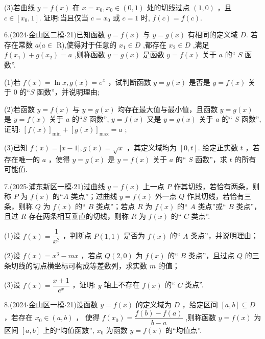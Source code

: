 (3)若曲线 $y = f\left( x\right)$ 在 $x = {x}_{0},{x}_{0} \in  \left( {0,1}\right)$ 处的切线过点 $\left( {1,0}\right)$ ，且 $c \in  \left\lbrack  {{x}_{0},1}\right\rbrack$. 证明:当且仅当 $c =  {x}_{0}$ 或 $c = 1$ 时, $\overline{f}\left( c\right)  = f\left( c\right)$.

6.(2024$\cdot$金山区二模$\cdot$21)已知函数 $y = f\left( x\right)$ 与 $y = g\left( x\right)$ 有相同的定义域 $D$. 若存在常数 $a(a \in$ R),使得对于任意的 ${x}_{1} \in  D$ ,都存在 ${x}_{2} \in  D$ ,满足 $f\left( {x}_{1}\right)  + g\left( {x}_{2}\right)  = a$ ,则称函数 $y = g\left( x\right)$ 是函数 $y = f\left( x\right)$ 关于 $a$ 的“ $S$ 函数”.

(1)若 $f\left( x\right)  = \ln x,g\left( x\right)  = {{e}}^{x}$ ，试判断函数 $y = g\left( x\right)$ 是否是 $y = f\left( x\right)$ 关于 0 的“$S$ 函数”，并说明理由;

(2)若函数 $y = f\left( x\right)$ 与 $y = g\left( x\right)$ 均存在最大值与最小值，且函数 $y = g\left( x\right)$ 是 $y = f\left( x\right)$ 关于 $a$ 的“$S$ 函数”, $y = f\left( x\right)$ 又是 $y = g\left( x\right)$ 关于 $a$ 的“ $S$ 函数”,证明: ${\left\lbrack  f\left( x\right) \right\rbrack  }_{\min } + {\left\lbrack  g\left( x\right) \right\rbrack  }_{\max } = a$ ;

(3)已知 $f\left( x\right)  = \left| {x - 1}\right| ,g\left( x\right)  = \sqrt{x}$ ，其定义域均为 $\left\lbrack  {0,t}\right\rbrack$. 给定正实数 $t$ ，若存在唯一的 $a$ ，使得 $y = g\left( x\right)$ 是 $y = f\left( x\right)$ 关于 $a$ 的“ $S$ 函数”，求 $t$ 的所有可能值.

7.(2025$\cdot$浦东新区一模$\cdot$21)过曲线 $y = f\left( x\right)$ 上一点 $P$ 作其切线，若恰有两条，则称 $P$ 为 $f\left( x\right)$ 的“$A$ 类点”；过曲线 $y = f\left( x\right)$ 外一点 $Q$ 作其切线，若恰有三条，则称 $Q$ 为 $f\left( x\right)$ 的“ $B$ 类点”；若点 $R$ 为 $f\left( x\right)$ 的“ $A$ 类点”或“ $B$ 类点”，且过 $R$ 存在两条相互垂直的切线，则称 $R$ 为 $f\left( x\right)$ 的“ $C$ 类点”.

(1)设 $f\left( x\right)  = \dfrac{1}{{x}^{2}}$ ，判断点 $P\left( {1,1}\right)$ 是否为 $f\left( x\right)$ 的“ $A$ 类点”，并说明理由；

(2)设 $f\left( x\right)  = {x}^{3} - {mx}$ ，若点 $Q\left( {2,0}\right)$ 为 $f\left( x\right)$ 的“ $B$ 类点”，且过点 $Q$ 的三条切线的切点横坐标可构成等差数列，求实数 $m$ 的值；

(3)设 $f\left( x\right)  = \dfrac{x + 1}{{{e}}^{x}}$ ，证明: $y$ 轴上不存在 $f\left( x\right)$ 的“ $C$ 类点”.

8.(2024$\cdot$金山区一模$\cdot$21)设函数 $y = f\left( x\right)$ 的定义域为 $D$ ，给定区间 $\left\lbrack  {a,b}\right\rbrack   \subseteq  D$ ，若存在 ${x}_{0} \in  \left( {a,b}\right)$ ， 使得 $f\left( {x}_{0}\right)  = \dfrac{f\left( b\right)  - f\left( a\right) }{b - a}$ ,则称函数 $y = f\left( x\right)$ 为区间 $\left\lbrack  {a,b}\right\rbrack$ 上的“均值函数”, ${x}_{0}$ 为函数 $y =  f\left( x\right)$ 的“均值点”.

